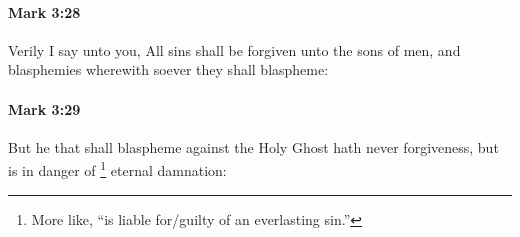 		\paragraph{Mark 3:28} %
			\label{MARK-3-28}

			Verily I say unto you, All sins shall be forgiven unto the sons of men, and blasphemies wherewith soever they shall blaspheme:

			\begin{framed}
			\scriptsize
				\begin{compactdesc}
					\item[SBLG] 
				\end{compactdesc}
			\end{framed}

		\paragraph{Mark 3:29} %
			\label{MARK-3-29}

			But he that shall blaspheme against the Holy Ghost hath never forgiveness, but is in danger of
				\footnote{%
					More like, ``is liable for/guilty of an everlasting sin.'' 
					}%
			eternal damnation:

